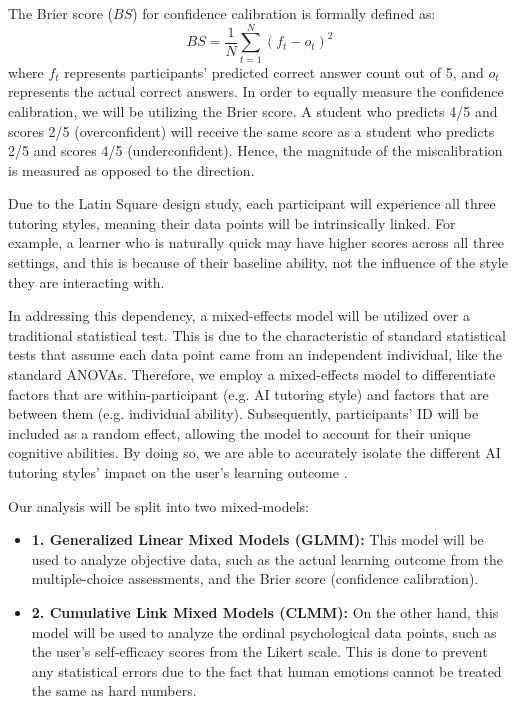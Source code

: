 \documentclass{article}
\begin{document}
The Brier score ($BS$) for confidence calibration is formally defined as:
\begin{equation}
BS = \frac{1}{N} \sum_{t=1}^{N} (f_t - o_t)^2
\end{equation}
where $f_t$ represents participants' predicted correct answer count out of 5, 
and $o_t$ represents the actual correct answers. 
In order to equally measure the confidence calibration, we will be utilizing the Brier score. 
A student who predicts 4/5 and scores 2/5 (overconfident) will receive the same score as 
a student who predicts 2/5 and scores 4/5 (underconfident). Hence, the magnitude of the 
miscalibration is measured as opposed to the direction.

Due to the Latin Square design study, each participant will 
experience all three tutoring styles, meaning 
their data points will be intrinsically linked. 
For example, a learner who is naturally 
quick may have higher scores across all three settings, 
and this is because of their baseline ability, not 
the influence of the style they are interacting with.

In addressing this dependency, a mixed-effects model 
will be utilized over a traditional statistical test. This is due 
to the characteristic of standard statistical tests that assume 
each data point came from an independent individual, like the 
standard ANOVAs. Therefore, we employ a mixed-effects model to 
differentiate factors that are within-participant (e.g. AI tutoring style) 
and factors that are between them (e.g. individual ability). 
Subsequently, participants' ID will be included as a random effect, 
allowing the model to account for their unique cognitive abilities. 
By doing so, we are able to accurately isolate the different AI 
tutoring styles' impact on the user's learning outcome \cite{Baayen2008}.


Our analysis will be split into two mixed-models: 
\vspace{-0.2em}
\begin{itemize}
    \item[] \textbf{1. Generalized Linear Mixed Models (GLMM):} 
    This model will be used to analyze objective data, such as 
    the actual learning outcome from the multiple-choice assessments, 
    and the Brier score (confidence calibration).
    \vspace{0.2em}
    \item[] \textbf{2. Cumulative Link Mixed Models (CLMM):} 
    On the other hand, this model will be used to analyze the ordinal psychological 
    data points, such as the user's self-efficacy scores from the Likert scale. 
    This is done to prevent any statistical errors due to the fact that 
    human emotions cannot be treated the same as hard numbers.
\end{itemize}
\vspace{-0.5em}
\end{document}
